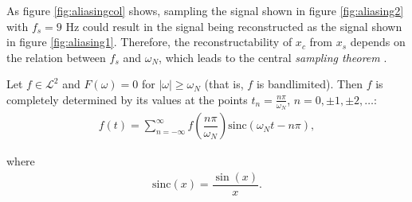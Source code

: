 As figure \ref{fig:aliasingcol} shows, sampling the signal shown in figure \ref{fig:aliasing2} with $f_s = 9$ Hz could result in the signal being reconstructed as the signal shown in figure \ref{fig:aliasing1}. Therefore, the reconstructability of $x_c$ from $x_s$ depends on the relation between $f_s$ and $\omega_N$, which leads to the central \textit{sampling theorem} \cite{page 230, FAA}.

\begin{theorem} \label{sampling_theorem}
Let $f \in \mathcal{L}^2$ and $F(\omega) = 0$ for $|\omega| \geq \omega_N$ (that is, $f$ is bandlimited). Then $f$ is completely determined by its values at the points $t_n = \frac{n \pi}{\omega_N}$, $n=0,\pm 1,\pm 2,\ldots$:
\begin{align*}
f(t) = \sum_{n=-\infty}^{\infty} f \left( \dfrac{n\pi}{\omega_N} \right) \mathrm{sinc}(\omega_N t - n\pi),
\end{align*}

where
\begin{align}
\mathrm{sinc}(x) = \dfrac{\sin(x)}{x}.
\end{align}
\end{theorem}

